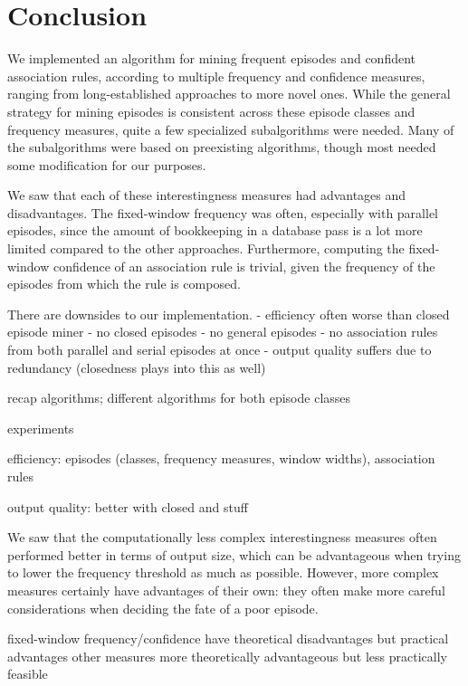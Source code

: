 \chapter{Conclusion}


We implemented an algorithm for mining frequent episodes and confident association rules, according to multiple frequency and confidence measures, ranging from long-established approaches to more novel ones. While the general strategy for mining episodes is consistent across these episode classes and frequency measures, quite a few specialized subalgorithms were needed. Many of the subalgorithms were based on preexisting algorithms, though most needed some modification for our purposes.


We saw that each of these interestingness measures had advantages and disadvantages. The fixed-window frequency was often, especially with parallel episodes, since the amount of bookkeeping in a database pass is a lot more limited compared to the other approaches. Furthermore, computing the fixed-window confidence of an association rule is trivial, given the frequency of the episodes from which the rule is composed.


There are downsides to our implementation.
- efficiency often worse than closed episode miner
- no closed episodes
- no general episodes
- no association rules from both parallel and serial episodes at once
- output quality suffers due to redundancy (closedness plays into this as well)

recap algorithms; different algorithms for both episode classes

experiments

efficiency: episodes (classes, frequency measures, window widths), association rules

output quality: better with closed and stuff

We saw that the computationally less complex interestingness measures often performed better in terms of output size, which can be advantageous when trying to lower the frequency threshold as much as possible. However, more complex measures certainly have advantages of their own: they often make more careful considerations when deciding the fate of a poor episode.

fixed-window frequency/confidence have theoretical disadvantages but practical advantages
other measures more theoretically advantageous but less practically feasible
